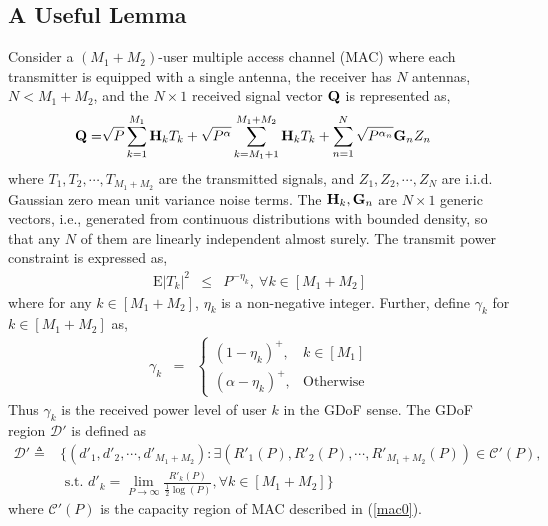 \documentclass[11pt]{article}
\begin{document}
\subsection{A Useful Lemma}
Consider a $(M_1+M_2)$-user multiple access channel (MAC) where each transmitter is equipped with a single antenna, the receiver has $N$ antennas, $N< M_1+M_2$, and the $N\times 1$ received signal vector ${\bf Q}$ is represented as,
\begin{align}
{\bf Q}=&\sqrt{P}\sum_{k=1}^{M_1} {\bf H}_k{ T}_k+\sqrt{P^{\alpha}}\sum_{k=M_1+1}^{M_1+M_2} {\bf H}_k{ T}_k+\sum_{n=1}^{N} \sqrt{P^{\alpha_n}}{\bf G}_nZ_n\label{mac0}
\end{align}
where  $T_1, T_2, \cdots, T_{M_1+M_2}$ are the transmitted signals, and $Z_1,Z_2,\cdots,Z_N$ are i.i.d. Gaussian zero mean unit variance noise terms. The ${\bf H}_k, {\bf G}_n$ are $N\times 1$ generic vectors, i.e.,  generated from continuous distributions with bounded density, so that any $N$ of them are linearly independent almost surely. The transmit power constraint is  expressed as,
\begin {eqnarray}
\mbox{E}{|T_{k}|}^2&\leq&P^{-\eta_k},~\forall k\in[M_1+M_2]\label{mac1}
\end{eqnarray}
where for any $k\in[M_1+M_2]$,  $\eta_k$ is a non-negative integer. Further, define $\gamma_k$ for $k\in[M_1+M_2]$ as,
\begin {eqnarray}
\gamma_k&=&\left\{
\begin{array}{ll} 
{(1-\eta_k)}^+,&k\in[M_1]\\ 
{(\alpha-\eta_k)}^+, &\text{Otherwise}
\end{array}
\right.\label{gamma1}
\end{eqnarray}
Thus $\gamma_k$ is the received power level of user $k$ in the GDoF sense. The GDoF region $\mathcal{D}'$ is defined as
\begin{align}
\mathcal{D}'\triangleq&\{(d'_1,d'_2,\cdots,d'_{M_1+M_2}): \exists (R'_1(P),R'_2(P),\cdots,R'_{M_1+M_2}(P))\in\mathcal{C}'(P),\nonumber\\
& \mbox{ s.t. } d'_k=\lim_{P\rightarrow\infty}\frac{R'_k(P)}{\frac{1}{2}\log{(P)}}, \forall k\in[M_1+M_2]\} \label {region}
\end{align}
 where $\mathcal{C}'(P)$ is the capacity region of MAC described in (\ref{mac0}).
 
\end{document}
